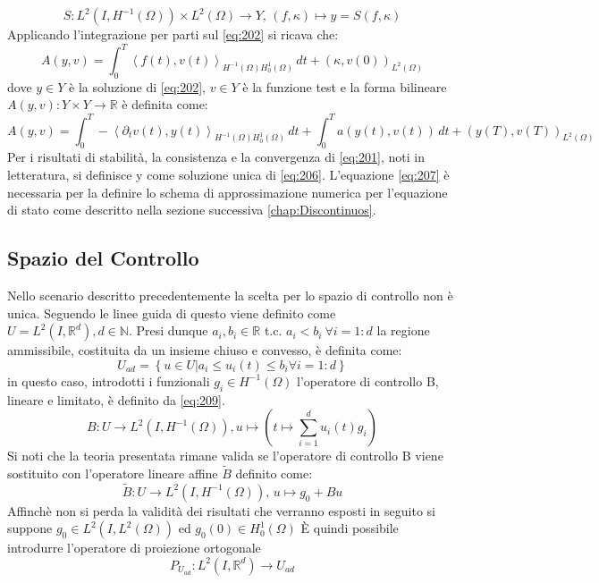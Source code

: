 \begin{equation}
S : L^2(I,{H^{-1}(\Omega)}) \times {L^{2}(\Omega)} \rightarrow Y \text{, } (f,\kappa) \longmapsto y = S(f,\kappa)
\label{eq:S}
\end{equation}
Applicando l'integrazione per parti sul \ref{eq:202} si ricava che:
\begin{equation}
A(y,v) = \int_{0}^{T} \left \langle f(t),v(t) \right \rangle_{{H^{-1}(\Omega)}{H^{1}_{0}(\Omega)}} \, dt + ({\kappa},v(0))_{L^{2}(\Omega)}
\label{eq:206}
\end{equation}
dove $y{\in}Y$ è la soluzione di \ref{eq:202}, $v{\in}Y$ è la funzione test e la forma bilineare $A(y,v): Y{\times}Y\rightarrow\mathbb{R}$ è definita come:
\begin{equation}
 A(y,v) = \int_{0}^{T} -\left \langle {\partial_{t}}v(t),y(t) \right \rangle_{{H^{-1}(\Omega)}{H^{1}_{0}(\Omega)}} \, dt + \int_{0}^{T} a(y(t),v(t)) \, dt + (y(T),v(T))_{L^{2}(\Omega)}
\label{eq:207}
\end{equation}
Per i risultati di stabilità, la consistenza e la convergenza di \eqref{eq:201}, noti in letteratura, si definisce y come soluzione unica di \eqref{eq:206}. L'equazione \eqref{eq:207} è necessaria per la definire  lo schema di approssimazione numerica per l'equazione di stato come descritto nella sezione successiva \ref{chap:Discontinuos}.

\subsection{Spazio del Controllo}
Nello scenario descritto precedentemente la scelta per lo spazio di controllo non è unica. Seguendo le linee guida di \cite{MAIN} questo viene definito come $U = L^2(I,\mathbb{R}^d), d \in \mathbb{N}$. Presi dunque $a_i, b_i \in \mathbb{R}$ t.c. $a_i<b_i \ {\forall}i=1:d$ la regione ammissibile, costituita da un insieme chiuso e convesso, è definita come:
\begin{equation}
U_{ad} = \left\{ u \in U | a_i \leq u_i(t) \leq b_i {\forall}i=1:d  \right\}
\label{eq:208}
\end{equation}
in questo caso, introdotti i funzionali $g_i \in {H^{-1}(\Omega)}$ l'operatore di controllo B, lineare e limitato, è definito da \ref{eq:209}.
\begin{equation}
B : U \rightarrow L^2(I,{H^{-1}(\Omega)}), u\mapsto \left( t\mapsto\sum_{i=1}^d u_i(t)g_i \right)
\label{eq:209}
\end{equation}
Si noti che la teoria presentata rimane valida se l'operatore di controllo B viene sostituito con l'operatore lineare affine $\tilde{B}$ definito come:
\begin{equation}
\tilde{B} : U \rightarrow L^2(I,{H^{-1}(\Omega)}) \text{, } u\mapsto g_0 + Bu
\label{eq:210}
\end{equation}
Affinchè non si perda la validità dei risultati che verranno esposti in seguito si suppone $g_0 \in L^2(I,{L^{2}(\Omega)})$ ed $g_0(0) \in {H^{1}_{0}(\Omega)}$
\MakeUppercase{è} quindi possibile introdurre l'operatore di proiezione ortogonale 
\begin{equation}
P_{U_{ad}} : L^2(I,\mathbb{R}^d)\rightarrow U_{ad}
\label{eq:211}
\end{equation}

